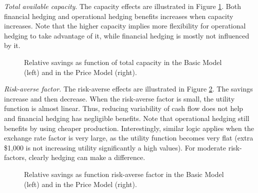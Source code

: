 \documentclass[mnsc,nonblindrev,copyedit]{informs2_wz} %
\begin{document}
{\noindent \em Total available capacity}.  The capacity effects are illustrated in Figure \ref{fig:capacity}.  Both financial hedging and operational hedging benefits increases when capacity increases.  Note that the higher capacity implies more flexibility for operational hedging to take advantage of it, while financial hedging is mostly not influenced by it.

\begin{figure}[ht]
\begin{center}
\begin{minipage}{6in}
    \begin{minipage}{3.1in}
        \epsfxsize=2.8in
   \hspace{-0.0in}     
    \end{minipage}
    \begin{minipage}{2.8in}
        \epsfxsize=2.8in
    \hspace{-0.0in}    
    \end{minipage}
\end{minipage}
\vspace{.05in} \caption{Relative savings as function of total capacity in the Basic Model (left) and in the Price Model (right).} \label{fig:capacity} \vspace{-.2in}
\end{center}
\end{figure}



{\noindent \em Risk-averse factor.} The risk-averse effects are illustrated in Figure \ref{fig:risk}.  The savings increase and then decrease.  When the risk-averse factor is small, the utility function is almost linear.  Thus, reducing variability of cash flow does not help and financial hedging has negligible benefits.  Note that operational hedging still benefits by using cheaper production.  Interestingly, similar logic applies when the exchange rate factor is very large, as the utility function becomes very flat (extra \$1,000 is not increasing utility significantly a high values).  For moderate risk-factors, clearly hedging can make a difference.  \begin{figure}[ht]
\begin{center}
\begin{minipage}{6in}
    \begin{minipage}{3.1in}
        \epsfxsize=2.8in
   \hspace{-0.0in}     
    \end{minipage}
    \begin{minipage}{2.8in}
        \epsfxsize=2.8in
   \hspace{-0.0in}     
    \end{minipage}
\end{minipage}
\vspace{.05in} \caption{Relative savings as function risk-averse factor in the Basic Model (left) and  in the Price Model (right).}
\label{fig:risk} \vspace{-.2in}
\end{center}
\end{figure}
\end{document}
